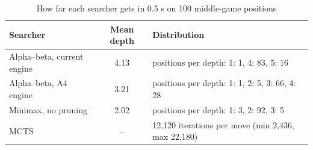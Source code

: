 \begin{table}[!htbp]
\centering\caption{How far each searcher gets in 0.5 s on 100 middle-game positions}\label{tab:depth}
\footnotesize
\begin{tabular}{@{}lcl@{}}
\toprule
Searcher & Mean depth & Distribution \\
\midrule
Alpha--beta, current engine & 4.13 & positions per depth: 1: 1, 4: 83, 5: 16 \\
Alpha--beta, A4 engine & 3.21 & positions per depth: 1: 1, 2: 5, 3: 66, 4: 28 \\
Minimax, no pruning & 2.02 & positions per depth: 1: 3, 2: 92, 3: 5 \\
MCTS & -- & 12,120 iterations per move (min 2,436, max 22,180) \\
\bottomrule
\end{tabular}
\par{}
\end{table}
